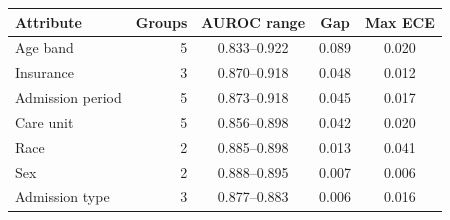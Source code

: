 \begin{tabular}{@{}lrccc@{}}
\toprule
Attribute & Groups & AUROC range & Gap & Max ECE \\
\midrule
Age band & 5 & 0.833--0.922 & 0.089 & 0.020 \\
Insurance & 3 & 0.870--0.918 & 0.048 & 0.012 \\
Admission period & 5 & 0.873--0.918 & 0.045 & 0.017 \\
Care unit & 5 & 0.856--0.898 & 0.042 & 0.020 \\
Race & 2 & 0.885--0.898 & 0.013 & 0.041 \\
Sex & 2 & 0.888--0.895 & 0.007 & 0.006 \\
Admission type & 3 & 0.877--0.883 & 0.006 & 0.016 \\
\bottomrule
\end{tabular}
